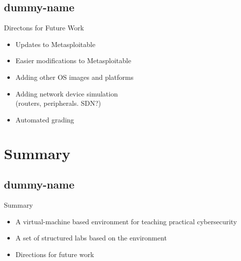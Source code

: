 \documentclass{beamer}
\begin{document}
	\subsection{dummy-name}
				
	\begin{frame}{Directons for Future Work}
		\begin{itemize}	
			\item Updates to Metasploitable
			\item Easier modifications to Metasploitable
			\item Adding other OS images and platforms
			\item Adding network device simulation\\(routers, peripherals. SDN?)
			\item Automated grading
		\end{itemize}
	\end{frame}

	\section{Summary}
	\subsection{dummy-name}	
	\begin{frame}{Summary}
		\begin{itemize}
			\item	A virtual-machine based environment for teaching practical cybersecurity
			\pause			
			\item A set of structured labs based on the environment
			\pause
			\item Directions for future work
		\end{itemize}
	\end{frame}
	
\end{document}
